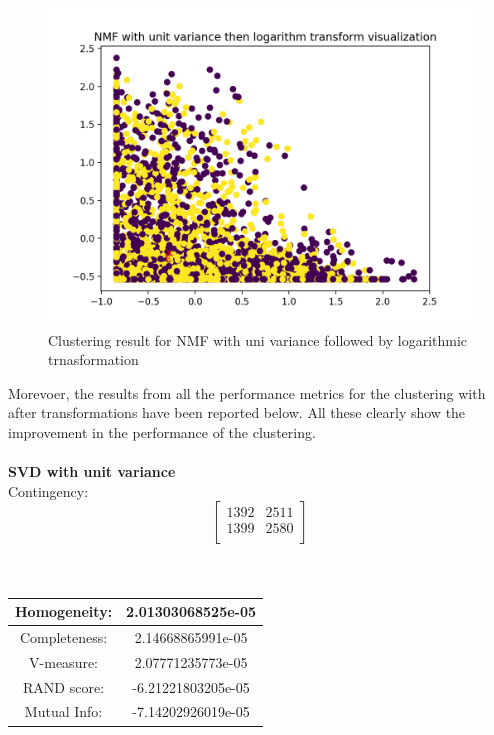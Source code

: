 \documentclass{report}
\begin{document}
\begin{figure}
  \includegraphics[width=\linewidth]{nmf_scale-log_p4.png} 
  \vspace*{-20mm}
  \caption{Clustering result for NMF with uni variance followed by logarithmic trnasformation}
  \label{fig:nmf5}
\end{figure}


Morevoer, the results from all the performance metrics for the clustering with after transformations have been reported below. All these clearly show the improvement in the performance of the clustering. \\ \\



\textbf{SVD with unit variance} \\
Contingency: \[
\begin{bmatrix}
1392 		& 2511 \\
1399 		& 2580 \\
\end{bmatrix}
\]
\\ \\

\begin{center}
\begin{tabu}{| c | c |}
\hline
Homogeneity: 		& 2.01303068525e-05 \\
\hline
Completeness: 		& 2.14668865991e-05 \\
\hline
V-measure: 			& 2.07771235773e-05 \\
\hline
RAND score: 		& -6.21221803205e-05 \\
\hline
Mutual Info: 		& -7.14202926019e-05 \\
\hline
\end{tabu}
\end{center}
\end{document}
